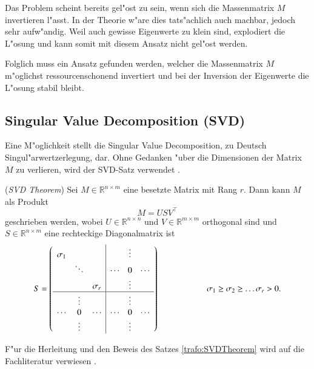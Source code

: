 \begin{refsection}
Das Problem scheint bereits gel"ost zu sein, wenn sich die Massenmatrix $M$ invertieren l"asst. In der Theorie w"are dies tats"achlich auch machbar, jedoch sehr aufw"andig. Weil auch gewisse Eigenwerte zu klein sind, explodiert die L"osung und kann somit mit diesem Ansatz nicht gel"ost werden.

Folglich muss ein Ansatz gefunden werden, welcher die Massenmatrix $M$ m"oglichst ressourcenschonend invertiert und bei der Inversion der Eigenwerte die L"osung stabil bleibt. 


\subsection{Singular Value Decomposition (SVD) }
Eine M"oglichkeit stellt die Singular Value Decomposition, zu Deutsch Singul"arwertzerlegung, dar. Ohne Gedanken "uber die Dimensionen der Matrix $M$ zu verlieren, wird der SVD-Satz verwendet \cite{trafo:Watkins}. 

\begin{satz}
	\label{trafo:SVDTheorem}
	(\textit{SVD Theorem}) Sei $M\in \mathbb{R}^{n \times m}$ eine besetzte Matrix mit Rang $r$. Dann kann $M$ als Produkt
	\begin{equation}
		M = USV^\top
		\label{trafo:svd}
	\end{equation} 
	geschrieben werden, wobei $U \in \mathbb{R}^{n \times n}$ und $V \in \mathbb{R}^{m \times m}$ orthogonal sind und $S \in \mathbb{R}^{n \times m}$ eine rechteckige Diagonalmatrix ist 
	\begin{equation*}
		S = \left( 
			\begin{array}{ccc|ccc}
				\sigma_1 &          &          &        & \vdots &        \\
				& \ddots   &          & \cdots & 0      & \cdots \\
				&          & \sigma_r &        & \vdots &        \\
				\hline
				&  \vdots  &          &        & \vdots &        \\
				\cdots   &  0       & \cdots   & \cdots & 0      & \cdots \\
				&  \vdots  &          &        & \vdots &   \\				
				\end{array}
			\right) 
			\hspace{2cm}\sigma_1 \geq \sigma_2 \geq \dots \sigma_r > 0. 
	\end{equation*}
\end{satz}
F"ur die Herleitung und den Beweis des Satzes \ref{trafo:SVDTheorem} wird auf die Fachliteratur verwiesen \cite{trafo:Watkins}.


\end{refsection}
